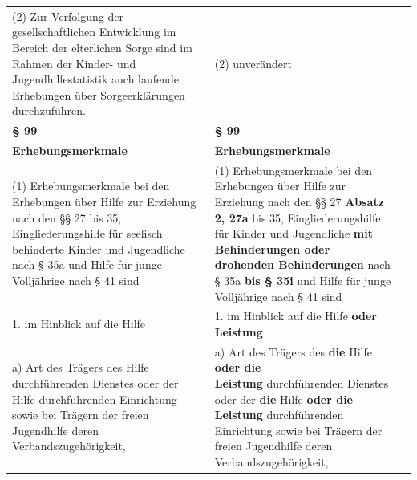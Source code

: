 \documentclass[10pt,a4paper,landscape]{article}
\begin{document}
\begin{longtable}{|L{8.2cm}|L{8.2cm}|L{8.2cm}|}
\hhline{|---|}
(2) Zur Verfolgung der gesellschaftlichen  \newline Entwicklung im Bereich der elterlichen  \newline Sorge sind im Rahmen der Kinder- und  \newline Jugendhilfestatistik auch laufende  \newline Erhebungen über Sorgeerklärungen  \newline durchzuführen. & (2) unverändert &  \\
\hhline{|---|}
\textbf{\S{} 99} & \textbf{\S{} 99} &  \\
\hhline{|---|}
\textbf{Erhebungsmerkmale } & \textbf{Erhebungsmerkmale } &  \\
\hhline{|---|}
(1) Erhebungsmerkmale bei den  \newline Erhebungen über Hilfe zur Erziehung nach  \newline den \S{}\S{} 27 bis 35, Eingliederungshilfe für  \newline seelisch behinderte Kinder und  \newline Jugendliche nach \S{} 35a und Hilfe für junge  \newline Volljährige nach \S{} 41 sind & (1) Erhebungsmerkmale bei den  \newline Erhebungen über Hilfe zur Erziehung nach  \newline den \S{}\S{} 27 \textbf{\textcolor{diffred}{Absatz 2, 27a}} bis 35,  \newline Eingliederungshilfe für Kinder und  \newline Jugendliche \textbf{\textcolor{diffred}{mit Behinderungen oder  \newline drohenden Behinderungen}} nach \S{} 35a  \newline \textbf{\textcolor{diffred}{bis \S{} 35i}} und Hilfe für junge Volljährige  \newline nach \S{} 41 sind &  \\
\hhline{|---|}
1. im Hinblick auf die Hilfe & 1. im Hinblick auf die Hilfe \textbf{\textcolor{diffred}{oder Leistung}} &  \\
\hhline{|---|}
a)   \newline Art des Trägers des Hilfe durchführenden  \newline Dienstes oder der Hilfe durchführenden  \newline Einrichtung sowie bei Trägern der freien  \newline Jugendhilfe deren Verbandszugehörigkeit, & a)   \newline Art des Trägers des \textbf{\textcolor{diffred}{die}} Hilfe \textbf{\textcolor{diffred}{oder die  \newline Leistung}} durchführenden Dienstes oder  \newline der \textbf{\textcolor{diffred}{die}} Hilfe \textbf{\textcolor{diffred}{oder die Leistung}}  \newline durchführenden Einrichtung sowie bei  \newline Trägern der freien Jugendhilfe deren  \newline Verbandszugehörigkeit, &  \\

\end{longtable}
\end{document}
